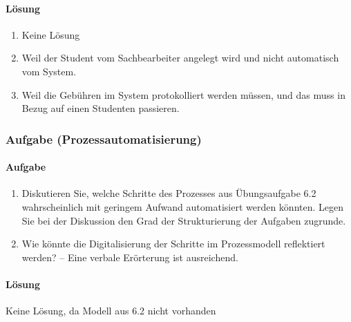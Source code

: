     \paragraph*{Lösung}
        \begin{enumerate}[label=\alph*)]
            \item Keine Lösung
            \item Weil der Student vom Sachbearbeiter angelegt wird und nicht automatisch vom System.
            \item Weil die Gebühren im System protokolliert werden müssen, und das muss in Bezug auf einen Studenten passieren.
        \end{enumerate}

\subsubsection*{Aufgabe (Prozessautomatisierung)}
    \paragraph*{Aufgabe}
        \begin{enumerate}[label=\alph*)]
            \item Diskutieren Sie, welche Schritte des Prozesses aus Übungsaufgabe 6.2 wahrscheinlich mit geringem Aufwand automatisiert werden könnten. Legen Sie bei der Diskussion den Grad der Strukturierung der Aufgaben zugrunde.
            \item Wie könnte die Digitalisierung der Schritte im Prozessmodell reflektiert werden? – Eine verbale Erörterung ist ausreichend.
        \end{enumerate}

    \paragraph*{Lösung}
        Keine Lösung, da Modell aus 6.2 nicht vorhanden
